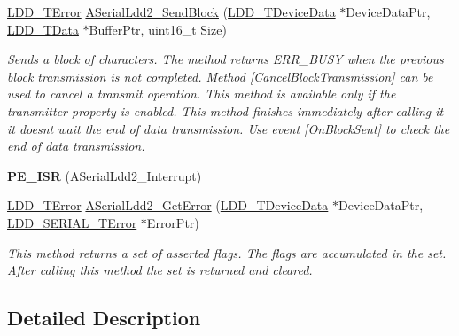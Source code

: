 \begin{DoxyCompactItemize}
\hyperlink{group___p_e___types__module_ga24c2b045fd04e79e85f261ce4df35588}{L\+D\+D\+\_\+\+T\+Error} \hyperlink{group___a_serial_ldd2__module_gabd167598efd957d04eb9bdd2e51ae673}{A\+Serial\+Ldd2\+\_\+\+Send\+Block} (\hyperlink{group___p_e___types__module_gac5cf1362f1f0e3a2ce71b1bf2276d091}{L\+D\+D\+\_\+\+T\+Device\+Data} $\ast$Device\+Data\+Ptr, \hyperlink{group___p_e___types__module_gade8ef9401405bd941b6da738b807f980}{L\+D\+D\+\_\+\+T\+Data} $\ast$Buffer\+Ptr, uint16\+\_\+t Size)
\begin{DoxyCompactList}\small\item\em Sends a block of characters. The method returns E\+R\+R\+\_\+\+B\+U\+SY when the previous block transmission is not completed. Method \mbox{[}Cancel\+Block\+Transmission\mbox{]} can be used to cancel a transmit operation. This method is available only if the transmitter property is enabled. This method finishes immediately after calling it -\/ it doesn\textquotesingle{}t wait the end of data transmission. Use event \mbox{[}On\+Block\+Sent\mbox{]} to check the end of data transmission. \end{DoxyCompactList}\item 
{\bfseries P\+E\+\_\+\+I\+SR} (A\+Serial\+Ldd2\+\_\+\+Interrupt)\hypertarget{group___a_serial_ldd2__module_ga8de88a30826abcdb10eeab68cc30bb09}{}\label{group___a_serial_ldd2__module_ga8de88a30826abcdb10eeab68cc30bb09}

\item 
\hyperlink{group___p_e___types__module_ga24c2b045fd04e79e85f261ce4df35588}{L\+D\+D\+\_\+\+T\+Error} \hyperlink{group___a_serial_ldd2__module_gafab1fb38c1ca4d64933a973a271ad7b0}{A\+Serial\+Ldd2\+\_\+\+Get\+Error} (\hyperlink{group___p_e___types__module_gac5cf1362f1f0e3a2ce71b1bf2276d091}{L\+D\+D\+\_\+\+T\+Device\+Data} $\ast$Device\+Data\+Ptr, \hyperlink{group___p_e___types__module_ga3bd5d57e02458ce220540d0ad0462e06}{L\+D\+D\+\_\+\+S\+E\+R\+I\+A\+L\+\_\+\+T\+Error} $\ast$Error\+Ptr)
\begin{DoxyCompactList}\small\item\em This method returns a set of asserted flags. The flags are accumulated in the set. After calling this method the set is returned and cleared. \end{DoxyCompactList}\end{DoxyCompactItemize}


\subsection{Detailed Description}


